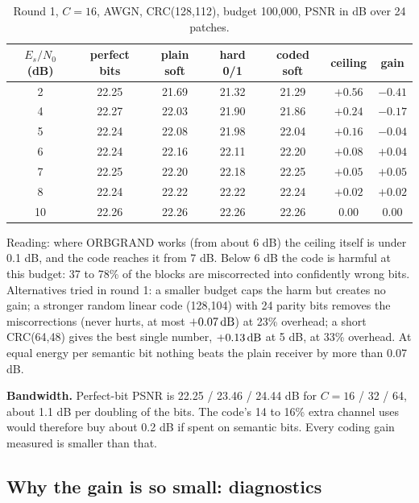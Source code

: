 \documentclass{article}
\begin{document}
\begin{table}[H]
\centering\small
\begin{tabular}{ccccccc}
\toprule
$E_s/N_0$ (dB) & perfect bits & plain soft & hard 0/1 & coded soft & ceiling & gain \\
\midrule
2 & 22.25 & 21.69 & 21.32 & 21.29 & $+0.56$ & $-0.41$ \\
4 & 22.27 & 22.03 & 21.90 & 21.86 & $+0.24$ & $-0.17$ \\
5 & 22.24 & 22.08 & 21.98 & 22.04 & $+0.16$ & $-0.04$ \\
6 & 22.24 & 22.16 & 22.11 & 22.20 & $+0.08$ & $+0.04$ \\
7 & 22.25 & 22.20 & 22.18 & 22.25 & $+0.05$ & $+0.05$ \\
8 & 22.24 & 22.22 & 22.22 & 22.24 & $+0.02$ & $+0.02$ \\
10 & 22.26 & 22.26 & 22.26 & 22.26 & $0.00$ & $0.00$ \\
\bottomrule
\end{tabular}
\caption{Round 1, $C=16$, AWGN, CRC(128,112), budget 100{,}000, PSNR in dB over 24 patches.}
\label{tab:r1awgn}
\end{table}

Reading: where ORBGRAND works (from about 6 dB) the ceiling itself is under 0.1 dB, and the code
reaches it from 7 dB. Below 6 dB the code is harmful at this budget: 37 to 78\% of the blocks are
miscorrected into confidently wrong bits. Alternatives tried in round 1: a smaller budget caps the harm
but creates no gain; a stronger random linear code (128,104) with 24 parity bits removes the
miscorrections (never hurts, at most $+0.07\,\mathrm{dB}$) at 23\% overhead; a short CRC(64,48) gives the best
single number, $+0.13\,\mathrm{dB}$ at 5 dB, at 33\% overhead. At equal energy per semantic bit nothing beats the
plain receiver by more than 0.07 dB.

\textbf{Bandwidth.} Perfect-bit PSNR is 22.25 / 23.46 / 24.44 dB for $C=16$ / 32 / 64, about 1.1 dB per
doubling of the bits. The code's 14 to 16\% extra channel uses would therefore buy about 0.2 dB if spent
on semantic bits. Every coding gain measured is smaller than that.

\subsection{Why the gain is so small: diagnostics}
\end{document}

